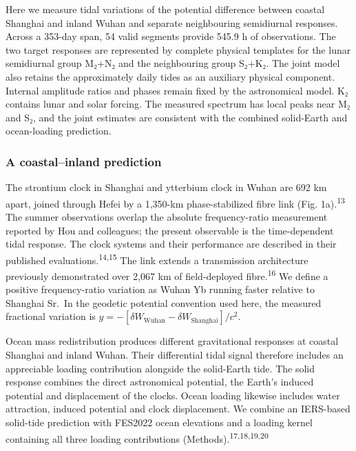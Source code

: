 \documentclass[
  12pt,
  a4paper,
]{article}
\begin{document}
Here we measure tidal variations of the potential difference between
coastal Shanghai and inland Wuhan and separate neighbouring semidiurnal
responses. Across a 353-day span, 54 valid segments provide 545.9 h of
observations. The two target responses are represented by complete
physical templates for the lunar semidiurnal group M₂+N₂ and the
neighbouring group S₂+K₂. The joint model also retains the approximately
daily tides as an auxiliary physical component. Internal amplitude
ratios and phases remain fixed by the astronomical model. K₂ contains
lunar and solar forcing. The measured spectrum has local peaks near M₂
and S₂, and the joint estimates are consistent with the combined
solid-Earth and ocean-loading prediction.

\hypertarget{a-coastalinland-prediction}{%
\subsubsection{A coastal--inland
prediction}\label{a-coastalinland-prediction}}

The strontium clock in Shanghai and ytterbium clock in Wuhan are 692 km
apart, joined through Hefei by a 1,350-km phase-stabilized fibre link
(Fig. 1a).\textsuperscript{13} The summer observations overlap the
absolute frequency-ratio measurement reported by Hou and colleagues; the
present observable is the time-dependent tidal response. The clock
systems and their performance are described in their published
evaluations.\textsuperscript{14,15} The link extends a transmission
architecture previously demonstrated over 2,067 km of field-deployed
fibre.\textsuperscript{16} We define a positive frequency-ratio
variation as Wuhan Yb running faster relative to Shanghai Sr.~In the
geodetic potential convention used here, the measured fractional
variation is
\(y=-[\delta W_{\mathrm{Wuhan}}-\delta W_{\mathrm{Shanghai}}]/c^2\).

Ocean mass redistribution produces different gravitational responses at
coastal Shanghai and inland Wuhan. Their differential tidal signal
therefore includes an appreciable loading contribution alongside the
solid-Earth tide. The solid response combines the direct astronomical
potential, the Earth's induced potential and displacement of the clocks.
Ocean loading likewise includes water attraction, induced potential and
clock displacement. We combine an IERS-based solid-tide prediction with
FES2022 ocean elevations and a loading kernel containing all three
loading contributions (Methods).\textsuperscript{17,18,19,20}
\end{document}
